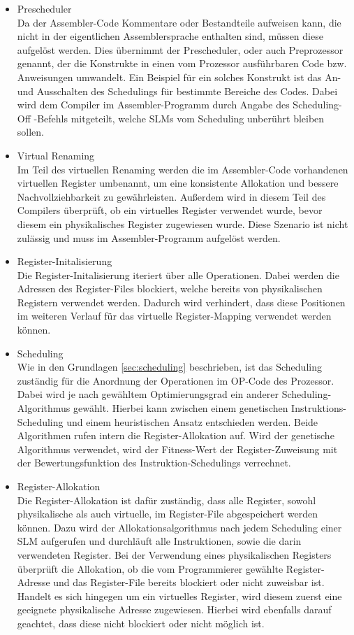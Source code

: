 \begin{itemize}
	\item Prescheduler\\
		Da der Assembler-Code Kommentare oder Bestandteile aufweisen kann, die nicht in der eigentlichen Assemblersprache enthalten sind, müssen diese aufgelöst werden. Dies übernimmt der Prescheduler, oder auch Preprozessor genannt, der die Konstrukte in einen vom Prozessor ausführbaren Code bzw. Anweisungen umwandelt. Ein Beispiel für ein solches Konstrukt ist das An- und Ausschalten des Schedulings für bestimmte Bereiche des Codes. Dabei wird dem Compiler im Assembler-Programm durch Angabe des \glqq Scheduling-Off \grqq-Befehls mitgeteilt, welche SLMs vom Scheduling unberührt bleiben sollen.
	\item Virtual Renaming\\
		Im Teil des virtuellen Renaming werden die im Assembler-Code vorhandenen virtuellen Register umbenannt, um eine konsistente Allokation und bessere Nachvollziehbarkeit zu gewährleisten. Außerdem wird in diesem Teil des Compilers überprüft, ob ein virtuelles Register verwendet wurde, bevor diesem ein physikalisches Register zugewiesen wurde. Diese Szenario ist nicht zulässig und muss im Assembler-Programm aufgelöst werden.
	\item Register-Initalisierung\\
		Die Register-Initalisierung iteriert über alle Operationen. Dabei werden die Adressen des Register-Files blockiert, welche bereits von physikalischen Registern verwendet werden. Dadurch wird verhindert, dass diese Positionen im weiteren Verlauf für das virtuelle Register-Mapping verwendet werden können.
	\item Scheduling\\
		Wie in den Grundlagen \ref{sec:scheduling} beschrieben, ist das Scheduling zuständig für die Anordnung der Operationen im OP-Code des Prozessor. Dabei wird je nach gewähltem Optimierungsgrad ein anderer Scheduling-Algorithmus gewählt. Hierbei kann zwischen einem genetischen Instruktions-Scheduling und einem heuristischen Ansatz entschieden werden. Beide Algorithmen rufen intern die Register-Allokation auf. Wird der genetische Algorithmus verwendet, wird der Fitness-Wert der Register-Zuweisung mit der Bewertungsfunktion des Instruktion-Schedulings verrechnet.
	\item Register-Allokation\\
		Die Register-Allokation ist dafür zuständig, dass alle Register, sowohl physikalische als auch virtuelle, im Register-File abgespeichert werden können. Dazu wird der Allokationsalgorithmus nach jedem Scheduling einer SLM aufgerufen und durchläuft alle Instruktionen, sowie die darin verwendeten Register. Bei der Verwendung eines physikalischen Registers überprüft die Allokation, ob die vom Programmierer gewählte Register-Adresse und das Register-File bereits blockiert oder nicht zuweisbar ist. Handelt es sich hingegen um ein virtuelles Register, wird diesem zuerst eine geeignete physikalische Adresse zugewiesen. Hierbei wird ebenfalls darauf geachtet, dass diese nicht blockiert oder nicht möglich ist.

\end{itemize}
